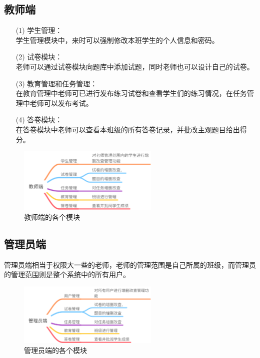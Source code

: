 \subsection{教师端}
\begin{enumerate}
	\item[(1)] 学生管理：\\
	学生管理模块中，来时可以强制修改本班学生的个人信息和密码。
	\item[(2)] 试卷模块：\\
	老师可以通过试卷模块向题库中添加试题，同时老师也可以设计自己的试卷。
	\item[(3)] 教育管理和任务管理：\\
	在教育管理中老师可已进行发布练习试卷和查看学生们的练习情况，在任务管理中老师可以发布考试。
	\item[(4)] 答卷模块：\\
	在答卷模块中老师可以查看本班级的所有答卷记录，并批改主观题目给出得分。
\end{enumerate}
\begin{figure}[!htbp]
\centering
\includegraphics[width=0.6\textwidth,keepaspectratio]{data/chapter-3/jiaoshiduan.png}
\caption{教师端的各个模块}
\label{figure:teacher}
\end{figure}

\subsection{管理员端}
管理员端相当于权限大一些的老师，老师的管理范围是自己所属的班级，而管理员的管理范围则是整个系统中的所有用户。
\begin{figure}[!htbp]
\centering
\includegraphics[width=0.6\textwidth,keepaspectratio]{data/chapter-3/admin.png}
\caption{管理员端的各个模块}
\label{figure:teacher}
\end{figure}